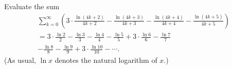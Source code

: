 Evaluate the sum
\begin{gather*}
\sum_{k=0}^\infty \left( 3 \cdot \frac{\ln(4k+2)}{4k+2} - \frac{\ln(4k+3)}{4k+3} - \frac{\ln(4k+4)}{4k+4} - \frac{\ln(4k+5)}{4k+5} \right) \\
= 3 \cdot \frac{\ln 2}{2} - \frac{\ln 3}{3} - \frac{\ln 4}{4} - \frac{\ln 5}{5}
+ 3 \cdot \frac{\ln 6}{6} - \frac{\ln 7}{7} \\ - \frac{\ln 8}{8} - \frac{\ln 9}{9}
+ 3 \cdot \frac{\ln 10}{10} - \cdots .
\end{gather*}
(As usual, $\ln x$ denotes the natural logarithm of $x$.)
